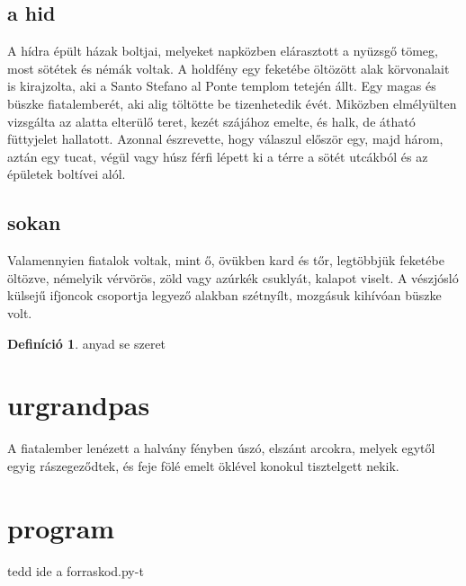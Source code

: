 \documentclass[12pt,a4paper,twoside]{report}
\theoremstyle{definition}
\newtheorem{definicio}{Definíció}[chapter]
\begin{document}
\subsection{a hid}
A hídra épült házak boltjai, 
melyeket napközben elárasztott a nyüzsgő tömeg, most sötétek és 
némák voltak. A holdfény egy feketébe öltözött alak körvonalait is 
kirajzolta, aki a Santo Stefano al Ponte templom tetején állt. Egy 
magas és büszke fiatalemberét, aki alig töltötte be tizenhetedik évét. 
Miközben  elmélyülten  vizsgálta  az  alatta  elterülő  teret,  kezét 
szájához  emelte,  és  halk,  de  átható  füttyjelet  hallatott.  Azonnal 
észrevette, hogy válaszul először egy, majd három, aztán egy tucat, 
végül vagy húsz férfi lépett ki a térre a sötét utcákból és az épületek 
boltívei alól. 
\subsection{sokan}
Valamennyien fiatalok voltak, mint ő, övükben kard és 
tőr,  legtöbbjük  feketébe  öltözve,  némelyik  vérvörös,  zöld  vagy 
azúrkék  csuklyát,  kalapot  viselt.  A  vészjósló  külsejű  ifjoncok 
csoportja legyező alakban szétnyílt, mozgásuk kihívóan büszke volt. 

\begin{definicio}\label{definicio}
    anyad se szeret
\end{definicio}

\section{urgrandpas}
A  fiatalember  lenézett a halvány  fényben úszó, elszánt arcokra, 
melyek  egytől  egyig  rászegeződtek,  és  feje  fölé  emelt  öklével 
konokul tisztelgett nekik. 

\section{program}
tedd ide a forraskod.py-t
\end{document}
